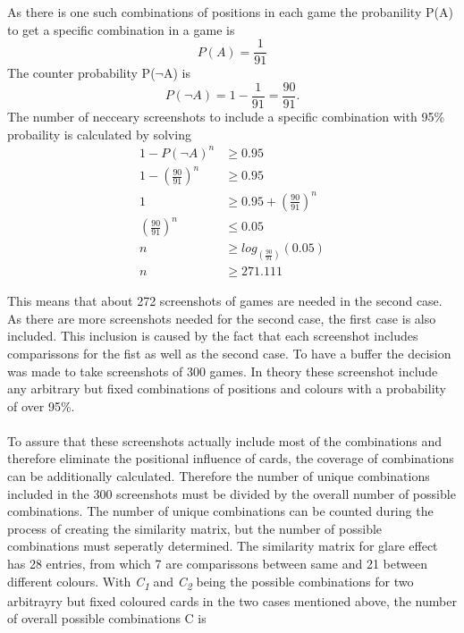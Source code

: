 \begin{center}
	As there is one such combinations of positions in each game the probanility P(A) to get a specific combination in a game is 
	\begin{equation*}
		P(A) = \frac{1}{91} %
	\end{equation*}
	The counter probability P($\lnot$A) is 
	\begin{equation*}
		P(\lnot A) = 1 - \frac{1}{91} = \frac{90}{91}.%
	\end{equation*}
	The number of necceary screenshots to include a specific combination with 95\% probaility is calculated by solving
	\begin{align*}
		1 - P(\lnot A)^n &\geq 0.95 \\
		1 - \left(\frac{90}{91}\right)^n &\geq 0.95 \\
		1 &\geq 0.95 + \left(\frac{90}{91}\right)^n\\
		\left(\frac{90}{91}\right)^n &\leq 0.05\\
		n &\geq log_{(\frac{90}{91})}(0.05) \\
		n &\geq 271.111 %
	\end{align*}
\end{center}
This means that about 272 screenshots of games are needed in the second case. As there are more screenshots needed for the second case, the first case is also included. This inclusion is caused by the fact that each screenshot includes comparissons for the  fist  as well as the second case. To have a buffer the decision was made to take screenshots of 300 games. In theory these screenshot include any arbitrary but fixed combinations of positions and colours with a probability of over 95\%.\\\\
To assure that these screenshots actually include most of the combinations and therefore eliminate the positional influence of cards, the coverage of combinations can be additionally calculated. Therefore the number of unique combinations included in the 300 screenshots must be divided by the overall number of possible combinations. The number of unique combinations can be counted during the process of creating the similarity matrix, but the number of possible combinations must seperatly determined. The similarity matrix for glare effect has 28 entries, from which 7 are comparissons between same and 21 between different colours. With \textit{C\textsubscript{1}} and \textit{C\textsubscript{2}}  being the possible combinations for two arbitrayry but fixed coloured cards in the two cases mentioned above, the number of overall possible combinations C is
